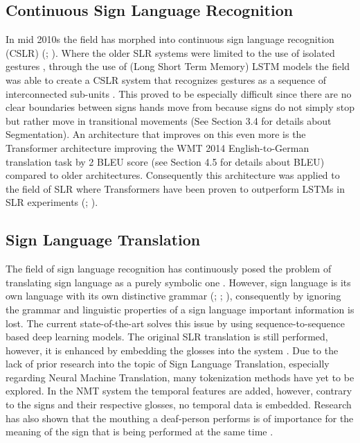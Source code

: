 \subsection{Continuous Sign Language Recognition}

In mid 2010s the field has morphed into continuous sign language recognition (CSLR) (\citealp{koller2015continuous}; \citealp{continuoussignlanguage}). Where the older SLR systems were limited to the use of isolated gestures \cite{cooper2011sign}, through the use of (Long Short Term Memory) LSTM models \cite{hochreiter1997long} the field was able to create a CSLR system that recognizes gestures as a sequence of interconnected sub-units \cite{mittal2019modified}. This proved to be especially difficult since there are no clear boundaries between signs hands move from because signs do not simply stop but rather move in transitional movements (See Section 3.4 for details about Segmentation). An architecture that improves on this even more is the Transformer architecture \cite{vaswani2017attention} improving the WMT 2014 English-to-German translation task by 2 BLEU score (see Section 4.5 for details about BLEU) compared to older architectures. Consequently this architecture was applied to the field of SLR where Transformers have been proven to outperform LSTMs in SLR experiments (\citealp{de2020sign}; \citealp{camgoz2020sign}).

\subsection{Sign Language Translation}

The field of sign language recognition has continuously posed the problem of translating sign language as a purely symbolic one \cite{camgoz2018neural}. However, sign language is its own language with its own distinctive grammar (\citealp{perniss2007}; \citealp{camgoz2018neural}; \citealp{camgoz2020sign}), consequently by ignoring the grammar and linguistic properties of a sign language important information is lost. The current state-of-the-art solves this issue by using sequence-to-sequence based deep learning models. The original SLR translation is still performed, however, it is enhanced by embedding the glosses into the system \cite{camgoz2018neural}. Due to the lack of prior research into the topic of Sign Language Translation, especially regarding Neural Machine Translation, many tokenization methods have yet to be explored. In the NMT system the temporal features are added, however, contrary to the signs and their respective glosses, no temporal data is embedded. Research has also shown that the mouthing a deaf-person performs is of importance for the meaning of the sign that is being performed at the same time \cite{kristoffersen2016designing}. 

